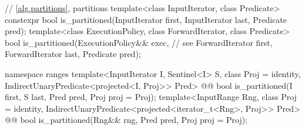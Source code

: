 \begin{codeblock}
  // \ref{alg.partitions}, partitions
  template<class InputIterator, class Predicate>
    constexpr bool is_partitioned(InputIterator first, InputIterator last, Predicate pred);
  template<class ExecutionPolicy, class ForwardIterator, class Predicate>
    bool is_partitioned(ExecutionPolicy&& exec, // see 
                        ForwardIterator first, ForwardIterator last, Predicate pred);
\end{codeblock}\begin{addedblock}\begin{codeblock}
  namespace ranges {
    template<InputIterator I, Sentinel<I> S, class Proj = identity,
        IndirectUnaryPredicate<projected<I, Proj>> Pred>
      @@ bool is_partitioned(I first, S last, Pred pred, Proj proj = Proj{});
    template<InputRange Rng, class Proj = identity,
        IndirectUnaryPredicate<projected<iterator_t<Rng>, Proj>> Pred>
      @@ bool is_partitioned(Rng&& rng, Pred pred, Proj proj = Proj{});
  }
\end{codeblock}\end{addedblock}\begin{codeblock}


\end{codeblock}
